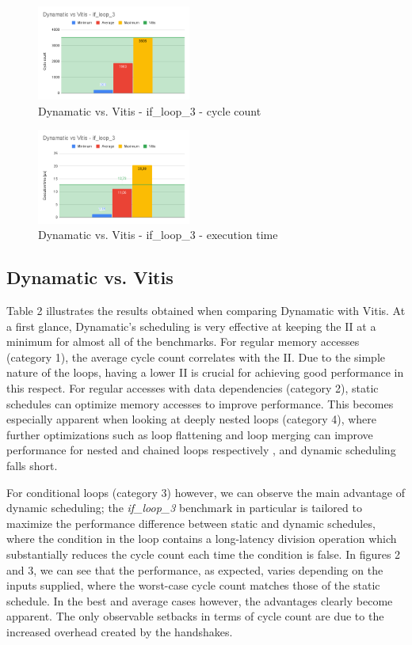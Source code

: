 \documentclass[final,5p,times,twocolumn]{elsarticle}
\begin{document}
\begin{spacing}{1.125}
\begin{figure}
	\centering 
	\includegraphics[width=0.45\textwidth]{vitis_if_loop_cycles.png}	
	\caption{Dynamatic vs. Vitis - if\_loop\_3 - cycle count} 
	\label{fig_mom0}%
\end{figure}

\begin{figure}
	\centering 
	\includegraphics[width=0.45\textwidth]{vitis_if_loop_runtime.png}	
	\caption{Dynamatic vs. Vitis - if\_loop\_3 - execution time} 
	\label{fig_mom0}%
\end{figure}



\subsection{Dynamatic vs. Vitis}

Table 2 illustrates the results obtained when comparing Dynamatic with Vitis. At a first glance, Dynamatic's scheduling is very effective at keeping the II at a minimum for almost all of the benchmarks. For regular memory accesses (category 1), the average cycle count correlates with the II. Due to the simple nature of the loops, having a lower II is crucial for achieving good performance in this respect. For regular accesses with data dependencies (category 2), static schedules can optimize memory accesses to improve performance. This becomes especially apparent when looking at deeply nested loops (category 4), where further optimizations such as loop flattening and loop merging can improve performance for nested and chained loops respectively \cite{vitis_ug}, and dynamic scheduling falls short.

For conditional loops (category 3) however, we can observe the main advantage of dynamic scheduling; the \textit{if\_loop\_3} benchmark in particular is tailored to maximize the performance difference between static and dynamic schedules, where the condition in the loop contains a long-latency division operation which substantially reduces the cycle count each time the condition is false. In figures 2 and 3, we can see that the performance, as expected, varies depending on the inputs supplied, where the worst-case cycle count matches those of the static schedule. In the best and average cases however, the advantages clearly become apparent. The only observable setbacks in terms of cycle count are due to the increased overhead created by the handshakes.


\end{spacing}
\end{document}
